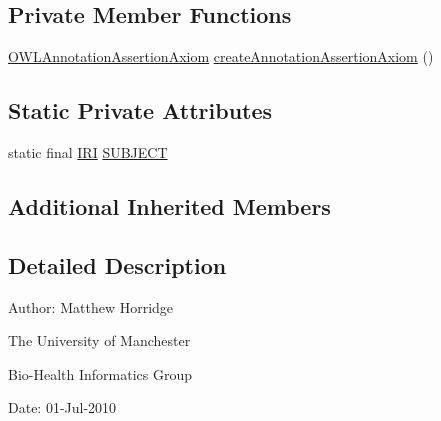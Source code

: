 \subsection*{Private Member Functions}
\begin{DoxyCompactItemize}
\item 
\hyperlink{interfaceorg_1_1semanticweb_1_1owlapi_1_1model_1_1_o_w_l_annotation_assertion_axiom}{O\-W\-L\-Annotation\-Assertion\-Axiom} \hyperlink{classorg_1_1semanticweb_1_1owlapi_1_1api_1_1test_1_1annotations_1_1_annotation_accessors_test_case_aeeeea4395b49be82a3e4e23a696bc8e2}{create\-Annotation\-Assertion\-Axiom} ()
\end{DoxyCompactItemize}
\subsection*{Static Private Attributes}
\begin{DoxyCompactItemize}
\item 
static final \hyperlink{classorg_1_1semanticweb_1_1owlapi_1_1model_1_1_i_r_i}{I\-R\-I} \hyperlink{classorg_1_1semanticweb_1_1owlapi_1_1api_1_1test_1_1annotations_1_1_annotation_accessors_test_case_aa6a346613d103b3014efd5f9c1ca12bf}{S\-U\-B\-J\-E\-C\-T}
\end{DoxyCompactItemize}
\subsection*{Additional Inherited Members}


\subsection{Detailed Description}
Author\-: Matthew Horridge\par
 The University of Manchester\par
 Bio-\/\-Health Informatics Group\par
 Date\-: 01-\/\-Jul-\/2010 

